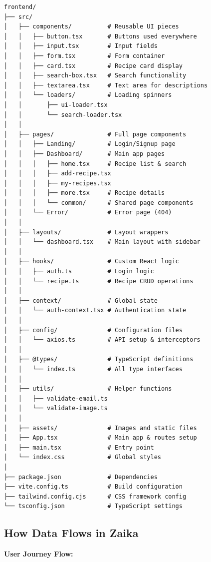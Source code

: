 \documentclass[12pt]{article}
\begin{document}
\begin{lstlisting}
frontend/
├── src/
│   ├── components/          # Reusable UI pieces
│   │   ├── button.tsx       # Buttons used everywhere
│   │   ├── input.tsx        # Input fields
│   │   ├── form.tsx         # Form container
│   │   ├── card.tsx         # Recipe card display
│   │   ├── search-box.tsx   # Search functionality
│   │   ├── textarea.tsx     # Text area for descriptions
│   │   └── loaders/         # Loading spinners
│   │       ├── ui-loader.tsx
│   │       └── search-loader.tsx
│   │
│   ├── pages/               # Full page components
│   │   ├── Landing/         # Login/Signup page
│   │   ├── Dashboard/       # Main app pages
│   │   │   ├── home.tsx     # Recipe list & search
│   │   │   ├── add-recipe.tsx
│   │   │   ├── my-recipes.tsx
│   │   │   ├── more.tsx     # Recipe details
│   │   │   └── common/      # Shared page components
│   │   └── Error/           # Error page (404)
│   │
│   ├── layouts/             # Layout wrappers
│   │   └── dashboard.tsx    # Main layout with sidebar
│   │
│   ├── hooks/               # Custom React logic
│   │   ├── auth.ts          # Login logic
│   │   └── recipe.ts        # Recipe CRUD operations
│   │
│   ├── context/             # Global state
│   │   └── auth-context.tsx # Authentication state
│   │
│   ├── config/              # Configuration files
│   │   └── axios.ts         # API setup & interceptors
│   │
│   ├── @types/              # TypeScript definitions
│   │   └── index.ts         # All type interfaces
│   │
│   ├── utils/               # Helper functions
│   │   ├── validate-email.ts
│   │   └── validate-image.ts
│   │
│   ├── assets/              # Images and static files
│   ├── App.tsx              # Main app & routes setup
│   ├── main.tsx             # Entry point
│   └── index.css            # Global styles
│
├── package.json             # Dependencies
├── vite.config.ts           # Build configuration
├── tailwind.config.cjs      # CSS framework config
└── tsconfig.json            # TypeScript settings
\end{lstlisting}

\subsection{How Data Flows in Zaika}

\begin{center}
\textbf{User Journey Flow:}
\end{center}
\end{document}
